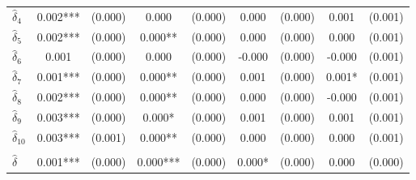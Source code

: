 {\begin{tabular}{l*{4}{cc}}
$\hat{\delta}_4$&       0.002***&     (0.000)&       0.000   &     (0.000)&       0.000   &     (0.000)&       0.001   &     (0.001)\\
$\hat{\delta}_5$&       0.002***&     (0.000)&       0.000** &     (0.000)&       0.000   &     (0.000)&       0.000   &     (0.001)\\
$\hat{\delta}_6$&       0.001   &     (0.000)&       0.000   &     (0.000)&      -0.000   &     (0.000)&      -0.000   &     (0.001)\\
$\hat{\delta}_7$&       0.001***&     (0.000)&       0.000** &     (0.000)&       0.001   &     (0.000)&       0.001*  &     (0.001)\\
$\hat{\delta}_8$&       0.002***&     (0.000)&       0.000** &     (0.000)&       0.000   &     (0.000)&      -0.000   &     (0.001)\\
$\hat{\delta}_9$&       0.003***&     (0.000)&       0.000*  &     (0.000)&       0.001   &     (0.000)&       0.001   &     (0.001)\\
$\hat{\delta}_{10}$&       0.003***&     (0.001)&       0.000** &     (0.000)&       0.000   &     (0.000)&       0.000   &     (0.001)\\
\addlinespace&               &            &               &            &               &            &               &            \\
$\hat{\delta}$&       0.001***&     (0.000)&       0.000***&     (0.000)&       0.000*  &     (0.000)&       0.000   &     (0.000)\\
\bottomrule
\end{tabular}
}
